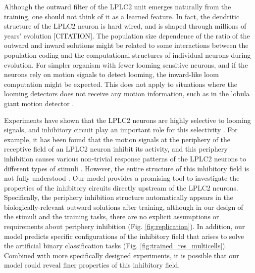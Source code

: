 \documentclass[9pt,lineno]{elife}
\begin{document}
Although the outward filter of the LPLC2 unit emerges naturally from the training, one should not think of it as a learned feature. In fact, the dendritic structure of the LPLC2 neuron is hard wired, and is shaped through millions of years' evolution [CITATION]. The population size dependence of the ratio of the outward and inward solutions might be related to some interactions between the population coding and the computational structures of individual neurons during evolution. For simpler organism with fewer looming sensitive neurons, and if the neurons rely on motion signals to detect looming, the inward-like loom computation might be expected. This does not apply to situations where the looming detectors does not receive any motion information, such as in the lobula giant motion detector \citep{rind1996neural}.

Experiments have shown that the LPLC2 neurons are highly selective to looming signals, and inhibitory circuit play an important role for this selectivity \citep{klapoetke2017ultra}. For example, it has been found that the motion signals at the periphery of the receptive field of an LPLC2 neuron inhibit its activity, and this periphery inhibition causes various non-trivial response patterns of the LPLC2 neurons to different types of stimuli \citep{klapoetke2017ultra}. However, the entire structure of this inhibitory field is not fully understood \citep{klapoetke2017ultra}. Our model provides a promising tool to investigate the properties of the inhibitory circuits directly upstream of the LPLC2 neurons. Specifically, the periphery inhibition structure automatically appears in the biologically-relevant outward solutions after training, although in our design of the stimuli and the training tasks, there are no explicit assumptions or requirements about periphery inhibition (Fig. \ref{fig:replication}). In addition, our model predicts specific configurations of the inhibitory field that arises to solve the artificial binary classification tasks (Fig. \ref{fig:trained_res_multicells}). Combined with more specifically designed experiments, it is possible that our model could reveal finer properties of this inhibitory field.
\end{document}

